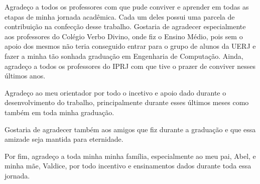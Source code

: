 
\begin{agradecimentos}

Agradeço a todos os professores com que pude conviver e aprender em todas as etapas de minha jornada acadêmica. Cada um deles possui uma parcela de contribuição na confecção desse trabalho. Gostaria de agradecer especialmente aos professores do Colégio Verbo Divino, onde fiz o Ensino Médio, pois sem o apoio dos mesmos não teria conseguido entrar para o grupo de alunos da UERJ e fazer a minha tão sonhada graduação em Engenharia de Computação. Ainda, agradeço a todos os professores do IPRJ com que tive o prazer de conviver nesses últimos anos.

Agradeço ao meu orientador por todo o incetivo e apoio dado durante o desenvolvimento do trabalho, principalmente durante esses últimos meses como também em toda minha graduação.

Gostaria de agradecer também aos amigos que fiz durante a graduação e que essa amizade seja mantida para eternidade.

Por fim, agradeço a toda minha minha família, especialmente ao meu pai, Abel, e minha mãe, Valdice, por todo incentivo e ensinamentos dados durante toda essa jornada.

\end{agradecimentos}